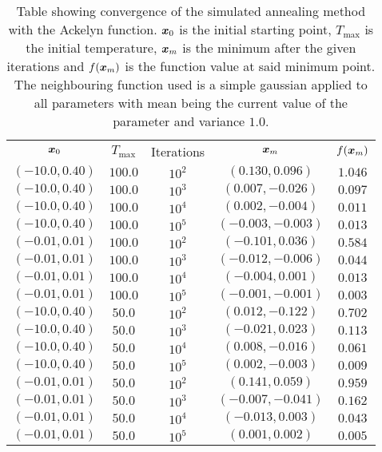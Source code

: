         \begin{table}[H]
            \centering
            \setlength{\tabcolsep}{23.6pt}
            \renewcommand*{\arraystretch}{0.72}
            \caption{Table showing convergence of the simulated annealing
            method with the Ackelyn function. $\boldsymbol{{x}}_0$ is the initial
            starting point, $T_{\text{max}}$ is the initial temperature,
            $\boldsymbol{{x}}_m$ is the minimum after the given iterations and
            $f(\boldsymbol{{x}}_m)$ is the function value at said minimum point. The
            neighbouring function used is a simple gaussian applied to all
            parameters with mean being the current value of the parameter and
            variance $1.0$.}
            \label{tab:ackelynconv}
            \begin{tabular}{ccccc} \hline\hline
                $\boldsymbol{{x}}_0$ & $T_{\text{max}}$ & Iterations & $\boldsymbol{{x}}_m$ & $f(\boldsymbol{{x}}_m)$ \\
                $(-10.0,0.40)$ & $100.0$ & $10^2$ & $(0.130,0.096)$ & $1.046$ \\
                $(-10.0,0.40)$ & $100.0$ & $10^3$ & $(0.007,-0.026)$ & $0.097$ \\
                $(-10.0,0.40)$ & $100.0$ & $10^4$ & $(0.002,-0.004)$ & $0.011$ \\
                $(-10.0,0.40)$ & $100.0$ & $10^5$ & $(-0.003,-0.003)$ & $0.013$ \\
                $(-0.01,0.01)$ & $100.0$ & $10^2$ & $(-0.101,0.036)$ & $0.584$ \\
                $(-0.01,0.01)$ & $100.0$ & $10^3$ & $(-0.012,-0.006)$ & $0.044$ \\
                $(-0.01,0.01)$ & $100.0$ & $10^4$ & $(-0.004,0.001)$ & $0.013$ \\
                $(-0.01,0.01)$ & $100.0$ & $10^5$ & $(-0.001,-0.001)$ & $0.003$ \\
                $(-10.0,0.40)$ & $50.0$ & $10^2$ & $(0.012,-0.122)$ & $0.702$ \\
                $(-10.0,0.40)$ & $50.0$ & $10^3$ & $(-0.021,0.023)$ & $0.113$ \\
                $(-10.0,0.40)$ & $50.0$ & $10^4$ & $(0.008,-0.016)$ & $0.061$ \\
                $(-10.0,0.40)$ & $50.0$ & $10^5$ & $(0.002,-0.003)$ & $0.009$ \\
                $(-0.01,0.01)$ & $50.0$ & $10^2$ & $(0.141,0.059)$ & $0.959$ \\
                $(-0.01,0.01)$ & $50.0$ & $10^3$ & $(-0.007,-0.041)$ & $0.162$ \\
                $(-0.01,0.01)$ & $50.0$ & $10^4$ & $(-0.013,0.003)$ & $0.043$ \\
                $(-0.01,0.01)$ & $50.0$ & $10^5$ & $(0.001,0.002)$ & $0.005$ \\ \hline\hline
            \end{tabular}
        \end{table}
